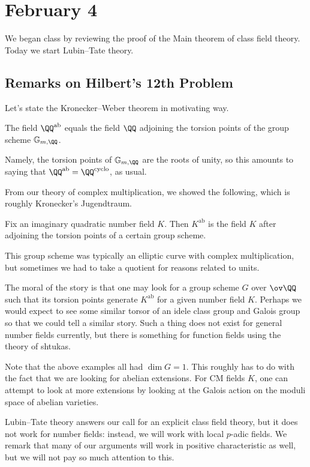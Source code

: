\documentclass[../notes.tex]{subfiles}
\begin{document}
\section{February 4}

We began class by reviewing the proof of the Main theorem of class field theory. Today we start Lubin--Tate theory.

\subsection{Remarks on Hilbert's 12th Problem}
Let's state the Kronecker--Weber theorem in motivating way.
\begin{theorem}
	The field $\QQ^{\mathrm{ab}}$ equals the field $\QQ$ adjoining the torsion points of the group scheme $\mathbb G_{m,\QQ}$.
\end{theorem}
Namely, the torsion points of $\mathbb G_{m,\QQ}$ are the roots of unity, so this amounts to saying that $\QQ^{\mathrm{ab}}=\QQ^{\mathrm{cyclo}}$, as usual.

From our theory of complex multiplication, we showed the following, which is roughly Kronecker's Jugendtraum.
\begin{theorem}
	Fix an imaginary quadratic number field $K$. Then $K^{\mathrm{ab}}$ is the field $K$ after adjoining the torsion points of a certain group scheme.
\end{theorem}
This group scheme was typically an elliptic curve with complex multiplication, but sometimes we had to take a quotient for reasons related to units.

The moral of the story is that one may look for a group scheme $G$ over $\ov\QQ$ such that its torsion points generate $K^{\mathrm{ab}}$ for a given number field $K$. Perhaps we would expect to see some similar torsor of an idele class group and Galois group so that we could tell a similar story. Such a thing does not exist for general number fields currently, but there is something for function fields using the theory of shtukas.
\begin{remark}
	Note that the above examples all had $\dim G=1$. This roughly has to do with the fact that we are looking for abelian extensions. For CM fields $K$, one can attempt to look at more extensions by looking at the Galois action on the moduli space of abelian varieties.
\end{remark}
Lubin--Tate theory answers our call for an explicit class field theory, but it does not work for number fields: instead, we will work with local $p$-adic fields. We remark that many of our arguments will work in positive characteristic as well, but we will not pay so much attention to this.
\end{document}
